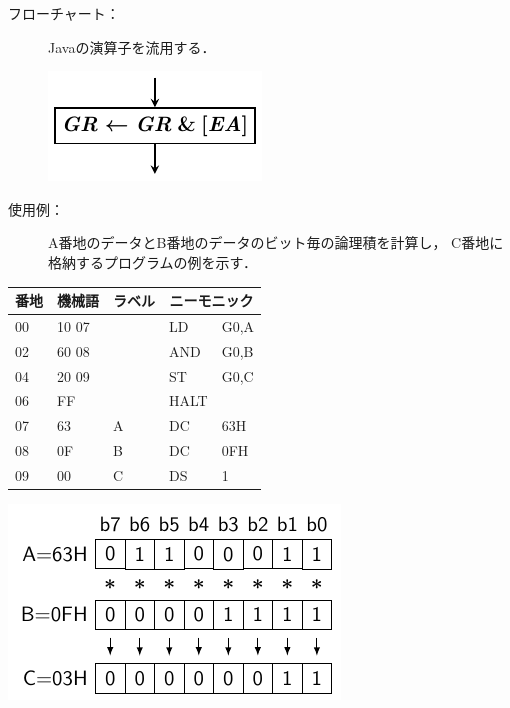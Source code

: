 \documentclass{beamer}                 %
\begin{document}
\begin{frame}
  \begin{description}
  \item[フローチャート：] Javaの演算子を流用する．\\
    \vfill
    \centerline{\includegraphics[scale=0.7]{../Tikz/and_chap5.pdf}}
    \vfill
  \item[使用例：]
    A番地のデータとB番地のデータのビット毎の論理積を計算し，
    C番地に格納するプログラムの例を示す．
  \end{description}
  \vfill
  \begin{minipage}{0.58\columnwidth}
    {\ttfamily\small\begin{center}
      \begin{tabular}{|l|l|l|l l|} \hline
        番地 & 機械語 & ラベル & \multicolumn{2}{|c|}{ニーモニック} \\
        \hline
        00 & 10 07 &   & LD   & G0,A \\
        02 & 60 08 &   & AND  & G0,B \\
        04 & 20 09 &   & ST   & G0,C \\
        06 & FF    &   & HALT &      \\
        07 & 63    & A & DC   & 63H  \\
        08 & 0F    & B & DC   & 0FH  \\
        09 & 00    & C & DS   & 1    \\
        \hline
      \end{tabular}
    \end{center}}
  \end{minipage}
  \begin{minipage}{0.38\columnwidth}
    \centerline{\includegraphics[scale=0.8]{../Tikz/land1.pdf}}
  \end{minipage}
  \vfill
  \vfill
\end{frame}
\end{document}
